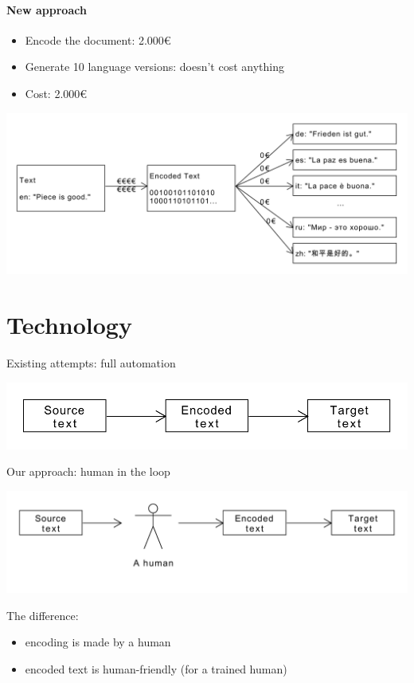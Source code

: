 \documentclass{article}
\begin{document}
\paragraph{New approach}

\begin{itemize}
\item Encode the document: 2.000€
\item Generate 10 language versions: doesn't cost anything
\item Cost: 2.000€
\end{itemize}

\includegraphics[scale=0.4]{dia/user-view-tokimani.pdf}


\section{Technology}

Existing attempts: full automation

\includegraphics[scale=0.5]{dia/how-current-world.pdf}

Our approach: human in the loop

\includegraphics[scale=0.5]{dia/how-tokimani.pdf}

The difference:
\begin{itemize}
\item encoding is made by a human
\item encoded text is human-friendly (for a trained human)
\end{itemize}
\end{document}
